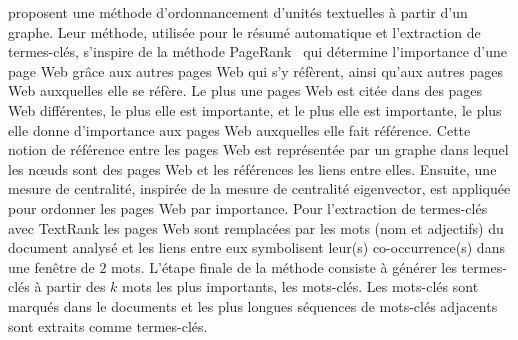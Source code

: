      proposent une méthode d'ordonnancement
    d'unités textuelles à partir d'un graphe. Leur méthode, utilisée pour le
    résumé automatique et l'extraction de termes-clés, s'inspire de la méthode
    PageRank~\cite{brin1998pagerank} qui détermine l'importance d'une page Web
    grâce aux autres pages Web qui s'y réfèrent, ainsi qu'aux autres pages Web
    auxquelles elle se réfère. Le plus une pages Web est citée dans des pages
    Web différentes, le plus elle est importante, et le plus elle est
    importante, le plus elle donne d'importance aux pages Web auxquelles elle
    fait référence. Cette notion de référence entre les pages Web est
    représentée par un graphe dans lequel les n\oe{}uds sont des pages Web et
    les références les liens entre elles. Ensuite, une mesure de centralité,
    inspirée de la mesure de centralité eigenvector, est appliquée pour ordonner
    les pages Web par importance. Pour l'extraction de termes-clés avec TextRank
    les pages Web sont remplacées par les mots (nom et adjectifs) du document
    analysé et les liens entre eux symbolisent leur(s) co-occurrence(s) dans une
    fenêtre de $2$ mots. L'étape finale de la méthode consiste à générer les
    termes-clés à partir des $k$ mots les plus importants, les mots-clés. Les
    mots-clés sont marqués dans le documents et les plus longues séquences de
    mots-clés adjacents sont extraits comme termes-clés.

